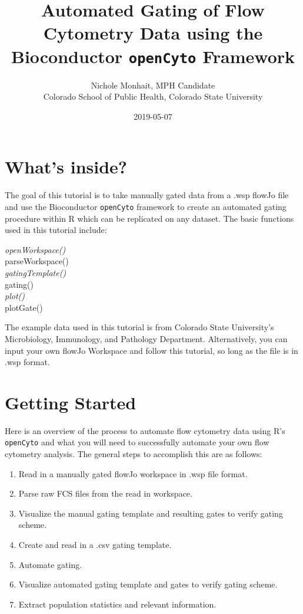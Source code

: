 \documentclass[]{book}
\title{Automated Gating of Flow Cytometry Data using the Bioconductor \texttt{openCyto} Framework}
\author{Nichole Monhait, MPH Candidate \\ Colorado School of Public Health, Colorado State University}
\date{2019-05-07}
\providecommand{\tightlist}{%
  \setlength{\itemsep}{0pt}\setlength{\parskip}{0pt}}
\begin{document}
\maketitle

{
\setcounter{tocdepth}{1}
\tableofcontents
}
\hypertarget{whats-inside}{%
\chapter{What's inside?}\label{whats-inside}}

The goal of this tutorial is to take manually gated data from a .wsp flowJo file and use the Bioconductor \texttt{openCyto} framework to create an automated gating procedure within R which can be replicated on any dataset. The basic functions used in this tutorial include:

\emph{openWorkspace()\\
}parseWorkspace()\\
\emph{gatingTemplate()\\
}gating()\\
\emph{plot()\\
}plotGate()

The example data used in this tutorial is from Colorado State University's Microbiology, Immunology, and Pathology Department. Alternatively, you can input your own flowJo Workspace and follow this tutorial, so long as the file is in .wsp format.

\hypertarget{getting-started}{%
\chapter{Getting Started}\label{getting-started}}

Here is an overview of the process to automate flow cytometry data using R's \texttt{openCyto} and what you will need to successfully automate your own flow cytometry analysis. The general steps to accomplish this are as follows:

\begin{enumerate}
\def\labelenumi{\arabic{enumi}.}
\tightlist
\item
  Read in a manually gated flowJo workspace in .wsp file format.
\item
  Parse raw FCS files from the read in workspace.
\item
  Visualize the manual gating template and resulting gates to verify gating scheme.
\item
  Create and read in a .csv gating template.
\item
  Automate gating.
\item
  Visualize automated gating template and gates to verify gating scheme.
\item
  Extract population statistics and relevant information.
\end{enumerate}
\end{document}
